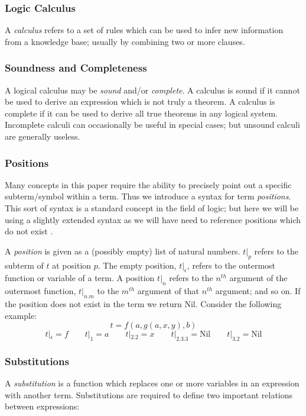 \subsubsection{Logic Calculus}

A \emph{calculus} refers to a set of rules which can be used to infer new information
from a knowledge base; usually by combining two or more clauses.

\subsubsection{Soundness and Completeness}

A logical calculus may be \emph{sound} and/or \emph{complete}. A calculus
is sound if it cannot be used to derive an expression which is not truly a theorem.
A calculus is complete if it can be used to derive all true theorems in any logical
system. Incomplete calculi can occasionally be useful in special cases; but unsound
calculi are generally useless.

\subsubsection{Positions}
Many concepts in this paper require the ability to precisely point out a specific
subterm/symbol within a term. Thus we introduce a syntax for term \emph{positions}.
This sort of syntax is a standard concept in the field of logic; but here we
will be using a slightly extended syntax as we will have need to reference
positions which do not exist \cite{shulz12}.

A \emph{position} is given as a (possibly empty) list of natural numbers.
$t|_p$ refers to the subterm of $t$ at position $p$.
The empty position, $t|_\epsilon$, refers to the outermost function or variable
of a term. A position $t|_n$ refers to the $n^{th}$ argument of the outermost function,
$t|_{n.m}$ to the $m^{th}$ argument of that $n^{th}$ argument; and so on. If the position
does not exist in the term we return Nil. Consider the following example:
\[t = f(a, g(a, x, y), b)\]
\[t|_{\epsilon} = f \quad\quad t|_{1} = a \quad\quad  t|_{2.2} = x \quad\quad  t|_{2.3.3} = \text{Nil} \quad\quad  t|_{3.2} = \text{Nil}\]

\subsubsection{Substitutions}

A \emph{substitution} is a function which replaces one or more variables in an expression
with another term. Substitutions are required to define two important relations between
expressions:

